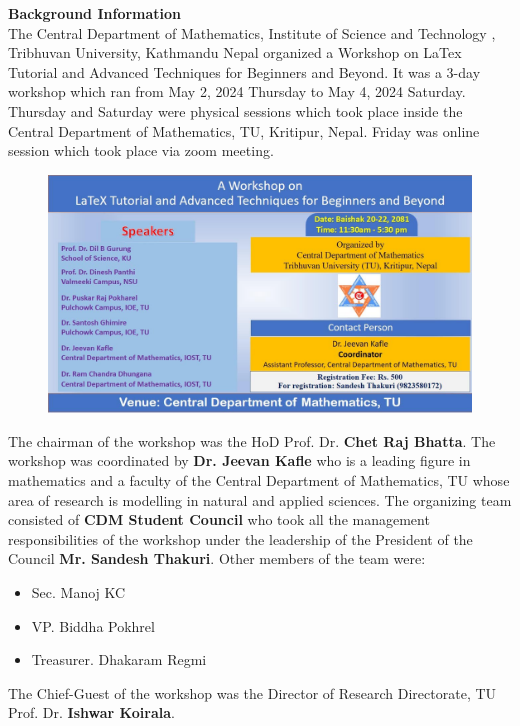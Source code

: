 \documentclass[a4paper,12pt]{report}
\begin{document}
\vspace*{5mm}
{\bfseries \Large Background Information}\\[4mm]
The Central Department of Mathematics, Institute of Science and Technology , Tribhuvan University, Kathmandu Nepal organized a Workshop on LaTex Tutorial and Advanced Techniques for Beginners and Beyond. It was a 3-day workshop which ran from May 2, 2024 Thursday to May 4, 2024 Saturday. Thursday and Saturday were physical sessions which took place inside the Central Department of Mathematics, TU, Kritipur, Nepal. Friday was online session which took place via zoom meeting.
\vspace{5mm}

\begin{figure}[h!]
  \centering
  \includegraphics[scale=0.33]{flyer.jpg}
\end{figure}
\vspace{9mm}

\noindent
The chairman of the workshop was the HoD Prof. Dr. \textbf{Chet Raj Bhatta}. The workshop was coordinated by \textbf{Dr. Jeevan Kafle} who is a leading figure in mathematics and a faculty of the Central Department of Mathematics, TU whose area of research is modelling in natural and applied sciences. The organizing team consisted of \textbf{CDM Student Council} who took all the management responsibilities of the workshop under the leadership of the President of the Council \textbf{Mr. Sandesh Thakuri}. Other members of the team were:
\begin{itemize}
\item Sec. Manoj KC
\item VP. Biddha Pokhrel
\item Treasurer. Dhakaram Regmi
\end{itemize}

\noindent
The Chief-Guest of the workshop was the Director of Research Directorate, TU Prof. Dr. \textbf{Ishwar Koirala}.
\clearpage
\end{document}
